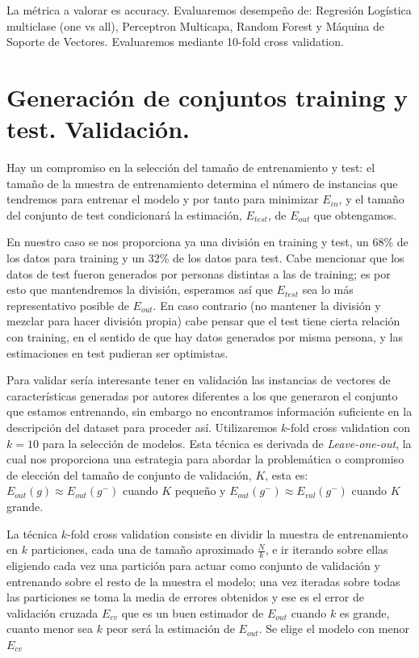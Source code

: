 \documentclass[11pt,a4paper]{article}
\theoremstyle{definition}
\begin{document}
	La métrica a valorar es accuracy. Evaluaremos desempeño de: Regresión Logística multiclase (one vs all), Perceptron Multicapa, Random Forest y Máquina de Soporte de Vectores. Evaluaremos mediante 10-fold cross validation.
	
	\section{Generación de conjuntos training y test. Validación.}
	Hay un compromiso en la selección del tamaño de entrenamiento y test: el tamaño de la muestra de entrenamiento determina el número de instancias que tendremos para entrenar el modelo y por tanto para minimizar $E_{in}$, y el  tamaño del conjunto de test condicionará la estimación, $E_{test}$, de $E_{out}$ que obtengamos. 
	
	En nuestro caso se nos proporciona ya una división en training y test, un 68\% de los datos para training y un 32\% de los datos para test. Cabe mencionar que los datos de test fueron generados por personas distintas a las de training; es por esto que mantendremos la división, esperamos así que $E_{test}$ sea lo más representativo posible de $E_{out}$. En caso contrario (no mantener la división y mezclar para hacer división propia) cabe pensar que el test tiene cierta relación con training, en el sentido de que hay datos generados por misma persona, y las estimaciones en test pudieran ser optimistas.
	
	Para validar sería interesante tener en validación las instancias de vectores de características generadas por autores diferentes a los que generaron el conjunto que estamos entrenando, sin embargo no encontramos información suficiente en la descripción del dataset para proceder así. Utilizaremos $k$-fold cross validation con $k=10$ para la selección de modelos. Esta técnica es derivada de \textit{Leave-one-out}, la cual nos proporciona una estrategia para abordar la problemática o compromiso de elección del tamaño de conjunto de validación, $K$, esta es: $E_{out}(g)\approx E_{out}(g^-)$ cuando $K$ pequeño y $E_{out}(g^-)\approx E_{val}(g^-)$ cuando $K$ grande. %
	
	 La técnica $k$-fold cross validation consiste en dividir la muestra de entrenamiento en $k$ particiones, cada una de tamaño aproximado $\frac{N}{k}$, e ir iterando sobre ellas eligiendo cada vez una partición para actuar como conjunto de validación y entrenando sobre el resto de la muestra el modelo; una vez iteradas sobre todas las particiones se toma la media de errores obtenidos y ese es el error de validación cruzada $E_{cv}\iffalse=\frac{1}{N}\sum_{i=1}^N E_{val}(g_i^-)\fi$ que es un buen estimador de $E_{out}$ cuando $k$ es grande, cuanto menor sea $k$ peor será la estimación de $E_{out}$. Se elige el modelo con menor $E_{cv}$
	 
\end{document}
